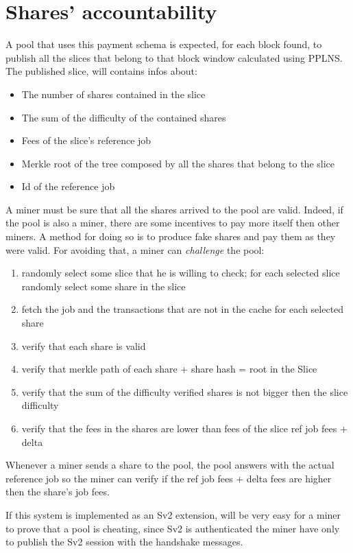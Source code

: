 \documentclass[11pt]{article}
\begin{document}
\section{Shares' accountability}
A pool that uses this payment schema is expected, for each block found, to publish all the slices
that belong to that block window calculated using PPLNS. The published slice, will contains infos
about:
\begin{itemize}
	\item The number of shares contained in the slice
	\item The sum of the difficulty of the contained shares
	\item Fees of the slice's reference job
	\item Merkle root of the tree composed by all the shares that belong to the slice
	\item Id of the reference job
\end{itemize}
A miner must be sure that all the shares arrived to the pool are valid. Indeed, if the pool is also a miner, there are some incentives to pay more itself then other miners. A method for doing so is to produce fake shares and pay them as they were valid. For avoiding that, a miner can \emph{challenge} the pool:
\begin{enumerate}
	\item randomly select some slice that he is willing to check; for each selected slice randomly select some share in the slice
	\item fetch the job and the transactions that are not in the cache for each selected share
	\item verify that each share is valid
	\item verify that merkle path of each share + share hash = root in the Slice
	\item verify that the sum of the difficulty verified shares is not bigger then the slice difficulty
	\item verify that the fees in the shares are lower than fees of the slice ref job fees + delta

\end{enumerate}

Whenever a miner sends a share to the pool, the pool answers with the actual reference job so the miner can verify if the ref job fees + delta fees are higher then the share's job fees.

If this system is implemented as an Sv2 extension, will be very easy for a miner to prove that a pool is cheating, since Sv2 is authenticated the miner have only to publish the Sv2 session with the handshake messages.
\end{document}
